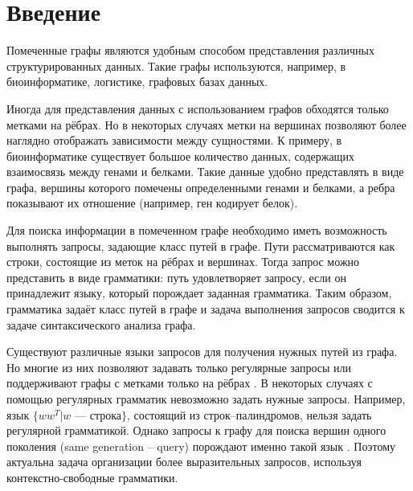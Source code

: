 \documentclass[14pt]{matmex-diploma}
\begin{document}
\maketitle
\tableofcontents
\section*{Введение}

 Помеченные графы являются удобным способом представления различных структурированных данных. Такие графы используются, например, в биоинформатике, логистике, графовых базах данных.

 Иногда для представления данных с использованием графов обходятся только метками на рёбрах. Но в некоторых случаях метки на вершинах позволяют более наглядно отображать зависимости между сущностями. К примеру, в биоинформатике существует большое количество данных, содержащих взаимосвязь между генами и белками. Такие данные удобно представлять в виде графа, вершины которого помечены определенными генами и белками, а ребра показывают их отношение (например, ген кодирует белок).
  

  Для поиска информации в помеченном графе необходимо иметь возможность выполнять запросы, задающие класс путей в графе. Пути рассматриваются как строки, состоящие из меток на рёбрах и вершинах. Тогда запрос можно представить в виде грамматики: путь удовлетворяет запросу, если он принадлежит языку, который порождает заданная грамматика. Таким образом, грамматика задаёт класс путей в графе и задача выполнения запросов сводится к задаче синтаксического анализа графа.
  
  
  Существуют различные языки запросов для получения нужных путей из графа. Но многие из них позволяют задавать только регулярные запросы \cite{abiteboul1997regular, prud2008sparql, koschmieder2012regular} или поддерживают графы с метками только на рёбрах \cite{hellings2014conjunctive}. В некоторых случаях с помощью регулярных грамматик невозможно задать нужные запросы. Например, язык $\{w w^T | w$ --- строка$\}$, состоящий из строк--палиндромов, нельзя задать регулярной грамматикой. Однако запросы к графу для поиска вершин одного поколения (same generation -- query) порождают именно такой язык \cite{zhang2016context}. Поэтому актуальна задача организации более выразительных запросов, используя контекстно-свободные грамматики.
\end{document}
